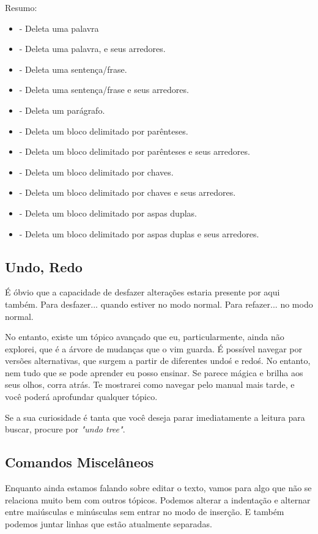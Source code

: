 Resumo:
\begin{itemize}
    \item {} - Deleta uma palavra
    \item {} - Deleta uma palavra, e seus arredores.
    \item {} - Deleta uma sentença/frase.
    \item {} - Deleta uma sentença/frase e seus arredores.
    \item {} - Deleta um parágrafo.
    \item {} - Deleta um bloco delimitado por parênteses.
    \item {} - Deleta um bloco delimitado por parênteses e seus arredores.
    \item {} - Deleta um bloco delimitado por chaves.
    \item {} - Deleta um bloco delimitado por chaves e seus arredores.
    \item {} - Deleta um bloco delimitado por aspas duplas.
    \item {} - Deleta um bloco delimitado por aspas duplas e seus arredores.
\end{itemize}

\subsection{Undo, Redo}
É óbvio que a capacidade de desfazer alterações estaria presente por aqui também.
Para desfazer...  quando estiver no modo normal.
Para refazer...  no modo normal.

No entanto, existe um tópico avançado que eu, particularmente, ainda não explorei, que é a árvore de mudanças que o vim guarda.
É possível navegar por versões alternativas, que surgem a partir de diferentes undo\'s e redo\'s.
No entanto, nem tudo que se pode aprender eu posso ensinar.
Se parece mágica e brilha aos seus olhos, corra atrás.
Te mostrarei como navegar pelo manual mais tarde, e você poderá aprofundar qualquer tópico.

Se a sua curiosidade é tanta que você deseja parar imediatamente a leitura para buscar, procure por \textit{"undo tree"}.

\subsection{Comandos Miscelâneos}
Enquanto ainda estamos falando sobre editar o texto, vamos para algo que não se relaciona muito bem com outros tópicos.
Podemos alterar a indentação e alternar entre maiúsculas e minúsculas sem entrar no modo de inserção.
E também podemos juntar linhas que estão atualmente separadas.

